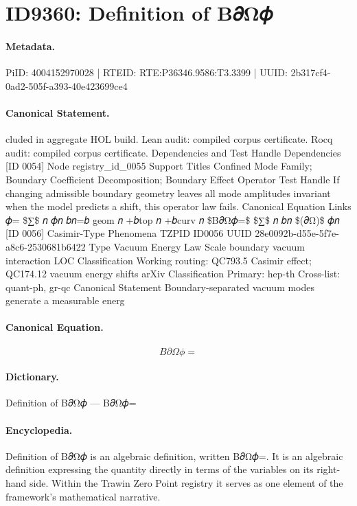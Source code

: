 \section*{ID9360: Definition of B𝜕Ω𝜙}
\paragraph{Metadata.}
PiID: 4004152970028 | RTEID: RTE:P36346.9586:T3.3399 | UUID: 2b317cf4-0ad2-505f-a393-40e423699ce4

\paragraph{Canonical Statement.}
cluded in aggregate HOL build. Lean audit: compiled corpus certificate. Rocq audit: compiled corpus certificate. Dependencies and Test Handle Dependencies [ID 0054] Node registry\_id\_0055 Support Titles Confined Mode Family; Boundary Coefficient Decomposition; Boundary Effect Operator Test Handle If changing admissible boundary geometry leaves all mode amplitudes invariant when the model predicts a shift, this operator law fails. Canonical Equation Links 𝜙= \$∑\$ 𝑛 𝜙𝑛 𝑏𝑛=𝑏 geom 𝑛 +𝑏top 𝑛 +𝑏curv 𝑛 \$B𝜕Ω𝜙=\$ \$∑\$ 𝑛 𝑏𝑛 \$(𝜕Ω)\$ 𝜙𝑛 [ID 0056] Casimir-Type Phenomena TZPID ID0056 UUID 28e0092b-d55e-5f7e-a8c6-2530681b6422 Type Vacuum Energy Law Scale boundary vacuum interaction LOC Classification Working routing: QC793.5 Casimir effect; QC174.12 vacuum energy shifts arXiv Classification Primary: hep-th Cross-list: quant-ph, gr-qc Canonical Statement Boundary-separated vacuum modes generate a measurable energ

\paragraph{Canonical Equation.}
\[
B𝜕Ω𝜙=
\]

\paragraph{Dictionary.}
Definition of B𝜕Ω𝜙 — B𝜕Ω𝜙=

\paragraph{Encyclopedia.}
Definition of B𝜕Ω𝜙 is an algebraic definition, written B𝜕Ω𝜙=. It is an algebraic definition expressing the quantity directly in terms of the variables on its right-hand side. Within the Trawin Zero Point registry it serves as one element of the framework's mathematical narrative.
